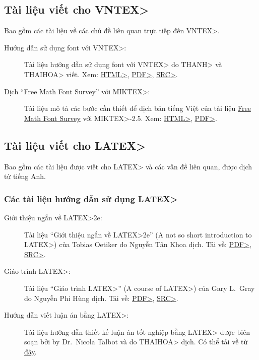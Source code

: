 \documentclass[12pt,a4paper]{article}
\begin{document}
\subsection{Tài liệu viết cho \<VNTEX>} 
\hypertarget{tai-lieu-vntex}{}
Bao gồm các tài liệu về các chủ đề liên quan trực tiếp đến \<VNTEX>.
\begin{description}
\item [Hướng dẫn sử dụng font với \<VNTEX>:]
Tài liệu hướng dẫn sử dụng font với \<VNTEX> do \<THANH> và \<THAIHOA>
viết. Xem:
\href{http://vntex.org/doc/vn-fonts.html}{\<HTML>},
\href{http://vntex.org/doc/vn-fonts.pdf}{\<PDF>},
\href{http://vntex.org/doc/vn-fonts-src.zip}{\<SRC>}.

\item [Dịch ``Free Math Font Survey'' với \<MIKTEX>:]
Tài liệu mô tả các bước cần thiết để dịch bản tiếng Việt của tài liệu
\href{http://www.tug.org/tex-archive/info/Free_Math_Font_Survey/survey.html}
{Free Math Font Survey} với \<MIKTEX>-2.5. Xem:
\href{http://vntex.org/doc/survey-vn-miktex.html}{\<HTML>},
\href{http://vntex.org/doc/survey-vn-miktex.pdf}{\<PDF>}.
\end{description}


\subsection{Tài liệu viết cho \<LATEX>} 
Bao gồm các tài liệu được viết cho \<LATEX> và các vấn đề liên quan, được
dịch từ tiếng Anh.

\subsubsection{Các tài liệu hướng dẫn sử dụng \<LATEX>} 
\begin{description}
\item[Giới thiệu ngắn về \<LATEX>2e:]
Tài liệu ``Giới thiệu ngắn về \<LATEX>2e'' (A not so short
introduction to \<LATEX>) của Tobias Oetiker 
do Nguyễn Tân Khoa dịch. Tải về:
\href{http://vntex.org/doc/lshort-vn.pdf}{\<PDF>},
\href{http://vntex.org/doc/lshort-vn-src.zip}{\<SRC>}.

\item[Giáo trình \<LATEX>:]
Tài liệu ``Giáo trình \<LATEX>'' (A course of \<LATEX>) của Gary
L.~Gray do Nguyễn Phi Hùng dịch. Tải về:
\href{http://vntex.org/doc/latex-course-vn.pdf}{\<PDF>},
\href{http://vntex.org/doc/latex-course-vn-src.zip}{\<SRC>}.

\item[Hướng dẫn viết luận án bằng \<LATEX>:]
Tài liệu hướng dẫn thiết kế luận án tốt nghiệp bằng \<LATEX> được biên soạn bởi by
Dr.~Nicola Talbot và do \<THAIHOA> dịch. Có thể tải về từ
\href{http://theoval.cmp.uea.ac.uk/~nlct/latex/thesis_viet/index.html}{đây}.
\end{description}
\end{document}
